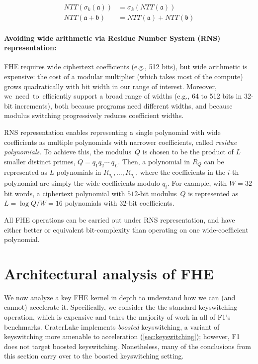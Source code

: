 \begin{align*}
    NTT(\sigma_k(\mathfrak{a})) &= \sigma_k(NTT(\mathfrak{a})) \\
    NTT(\mathfrak{a} + \mathfrak{b}) &= NTT(\mathfrak{a}) + NTT(\mathfrak{b})
\end{align*}

\paragraph{Avoiding wide arithmetic via Residue Number System (RNS) representation:}
FHE requires wide ciphertext coefficients (e.g., 512 bits), but wide arithmetic
is expensive: the cost of a modular multiplier (which takes most of the
compute) grows quadratically with bit width in our range of interest. Moreover,
\mbox{we need to efficiently} support a broad range of widths (e.g., 64 to 512
bits in 32-bit increments), both because programs need different widths, and
because modulus switching progressively reduces coefficient widths.

RNS representation \cite{garner:1959:residue} enables representing a single
polynomial with wide coefficients as multiple polynomials with narrower
coefficients, called \emph{residue polynomials}. To achieve this, the
modulus~$Q$  is chosen to be the product of $L$ smaller distinct primes, $Q =
q_1q_2\cdots\ q_L$. Then, a polynomial in $R_Q$ can be represented as $L$
polynomials in $R_{q_1}, \ldots, R_{q_L}$, where the coefficients in the $i$-th
polynomial are simply the wide coefficients modulo $q_i$. For example, with $W
= 32$-bit words, a ciphertext polynomial with $512$-bit modulus~$Q$ is
represented as $L = \log Q/W = 16$ polynomials with $32$-bit coefficients.

All FHE operations can be carried out under RNS representation, and have either
better or equivalent bit-complexity than operating on one wide-coefficient
polynomial.

\section{Architectural analysis of FHE}
\label{sec:fhe_analysis}

We now analyze a key FHE kernel in depth to understand how we can (and cannot)
accelerate it. Specifically, we consider the the standard keyswitching
operation, which is expensive and takes the majority of work in all of F1's
benchmarks. CraterLake implements \emph{boosted} keyswitching, a variant of
keyswitching more amenable to acceleration (\autoref{sec:keyswitching});
however, F1 does not target boosted keyswitching. Nonetheless, many of the
conclusions from this section carry over to the boosted keyswitching setting.

